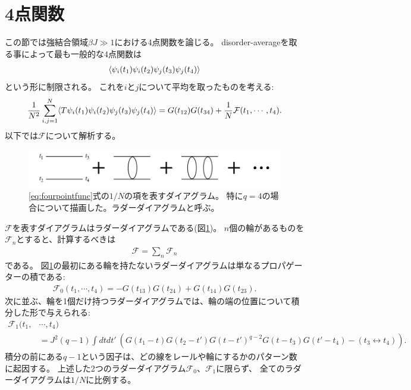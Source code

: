 \section{4点関数}

この節では強結合領域$\beta J \gg 1$における4点関数を論じる。
disorder-averageを取る事によって最も一般的な4点関数は
\begin{align}
	\langle \psi_i(t_1)\psi_i(t_2)\psi_j(t_3)\psi_j(t_4) \rangle
\end{align}
という形に制限される。
これを$i$と$j$について平均を取ったものを考える:
\begin{align}
	\frac{1}{N^2}\sum_{i,j=1}^{N}\langle T\psi_i(t_1)\psi_i(t_2)\psi_j(t_3)\psi_j(t_4) \rangle
	= G(t_{12})G(t_{34}) + \frac{1}{N}\mathcal{F}(t_1, \cdots, t_4).
	\label{eq:fourpointfunc}
\end{align}
以下では$\mathcal{F}$について解析する。

\begin{figure}[h]
	\centering
	\vspace{1cm}
	\includegraphics[width=13cm]{figures/ladderDiagram}
	\caption{\eqref{eq:fourpointfunc}式の$1/N$の項を表すダイアグラム。
		特に$q=4$の場合について描画した。ラダーダイアグラムと呼ぶ。}
	\label{fig:ladderdiagram}
\end{figure}

$\mathcal{F}$を表すダイアグラムはラダーダイアグラムである(図\ref{fig:ladderdiagram})。
$n$個の輪があるものを$\mathcal{F}_n$とすると、計算するべきは
\begin{align}
	\mathcal{F} = \sum_n \mathcal{F}_n
\end{align}
である。
図\ref{fig:ladderdiagram}の最初にある輪を持たないラダーダイアグラムは単なるプロパゲーターの積である:
\begin{align}
	\mathcal{F}_0(t_1, \cdots, t_4) = -G(t_{13})G(t_{24}) + G(t_{14})G(t_{23}).
\end{align}
次に並ぶ、輪を1個だけ持つラダーダイアグラムでは、輪の端の位置について積分した形で与えられる:
\begin{align}
	\mathcal{F}_1(t_1, &\cdots, t_4)\nonumber\\
	&= J^2(q - 1)\int dtdt'\ \left(
		G(t_1 - t)G(t_2 - t')G(t - t')^{q-2}G(t - t_3)G(t' - t_4) - (t_3 \leftrightarrow t_4)
	\right).
\end{align}
積分の前にある$q-1$という因子は、どの線をレールや輪にするかのパターン数に起因する。
上述した2つのラダーダイアグラム$\mathcal{F}_0$、$\mathcal{F}_1$に限らず、
全てのラダーダイアグラムは$1/N$に比例する。

